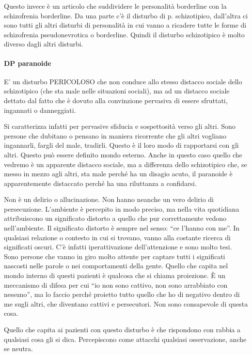 Questo
invece è un articolo che suddividere le personalità borderline con la
schizofrenia borderline. Da una parte c'è il disturbo di p.
schizotipico, dall'altra ci sono tutti gli altri disturbi di personalità
in cui vanno a ricadere tutte le forme di schizofrenia pseudonevrotica o
borderline. Quindi il disturbo schizotipico è molto diverso dagli altri
disturbi.

\paragraph{DP paranoide}

E' un disturbo PERICOLOSO che non conduce allo stesso distacco sociale
dello schizotipico (che sta male nelle situazioni sociali), ma ad un
distacco sociale dettato dal fatto che è dovuto alla convinzione
pervasiva di essere sfruttati, ingannati o danneggiati.

Si caratterizza infatti per pervasive sfiducia e sospettosità verso gli
altri. Sono persone che dubitano o pensano in maniera ricorrente che gli
altri vogliano ingannarli, fargli del male, tradirli. Questo è il loro
modo di rapportarsi con gli altri. Questo può essere definito mondo
esterno. Anche in questo caso quello che vedremo è un apparente distacco
sociale, ma a differenza dello schizotipico che, se messo in mezzo agli
altri, sta male perché ha un disagio acuto, il paranoide è
apparentemente distaccato perché ha una riluttanza a confidarsi.

Non è un delirio o allucinazione. Non hanno neanche un vero delirio di
persecuzione. L'ambiente è percepito in modo preciso, ma nella vita
quotidiana attribuiscono un significato distorto a quello che pur
correttamente vedono nell'ambiente. Il significato distorto è sempre nel
senso: ``ce l'hanno con me''. In qualsiasi relazione o contesto in cui
si trovano, vanno alla costante ricerca di significati oscuri. C'è
infatti iperattivazione dell'attenzione e sono molto tesi. Sono persone
che vanno in giro molto attente per captare tutti i significati nascosti
nelle parole o nei comportamenti della gente. Quello che capita nel
mondo interno di questi pazienti è qualcosa che si chiama proiezione. È
un meccanismo di difesa per cui ``io non sono cattivo, non sono
arrabbiato con nessuno'', ma lo faccio perché proietto tutto quello che
ho di negativo dentro di me sugli altri, che diventano cattivi e
persecutori. Non sono consapevole di questa cosa.

Quello che capita ai pazienti con questo disturbo è che rispondono con
rabbia a qualsiasi cosa gli si dica. Percepiscono come attacchi
qualsiasi osservazione, anche se neutra.


